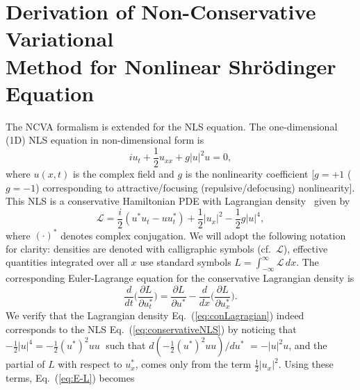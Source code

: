 \section{Derivation of Non-Conservative Variational \\ Method for Nonlinear Shr\"{o}dinger Equation}
\label{sec:NLS}
The NCVA formalism is extended for the NLS equation.  The one-dimensional (1D) NLS equation in non-dimensional form is~\cite{ref10} 
\begin{equation}
i u_t + \frac{1}{2} u_{xx} + g |u|^2 u  = 0,
\label{eq:conservativeNLS}
\end{equation}
where $u(x,t)$ is the complex field and $g$ is the nonlinearity coefficient [$g=+1$ ($g=-1$) corresponding to attractive/focusing (repulsive/defocusing) nonlinearity].  This NLS is a conservative Hamiltonian PDE with  Lagrangian density~\cite{ref5, ref6, ref10} given by
\begin{equation}
\mathcal{L} = \frac{i}{2} (u^* u_t - u u_t^*) + \frac{1}{2} |u_x|^2 - \frac{1}{2} g |u|^4,
\label{eq:conLagragian}
\end{equation}
where $(\cdot)^*$ denotes complex conjugation.  We will adopt the following notation for clarity: densities are denoted with calligraphic symbols (cf.~$\mathcal{L}$), effective quantities integrated over all $x$ use standard symbols $L = \int_{-\infty}^{\infty} {\mathcal{L}}\,dx$.
The corresponding Euler-Lagrange equation for the conservative Lagrangian density is 
\begin{equation}
\frac{d}{dt} \Bigg( \frac{\partial L}{\partial u_t^*} \Bigg) = \frac{\partial L}{\partial u^*} - \frac{d}{dx} \Bigg( \frac{\partial L}{\partial u_x^*} \Bigg).
\label{eq:E-L}
\end{equation}
We verify that the Lagrangian density Eq.~(\ref{eq:conLagragian}) indeed corresponds to the NLS Eq.~(\ref{eq:conservativeNLS}) by noticing that $-\frac{1}{2} |u|^4 = -\frac{1}{2} (u^*)^2 u u \;$ such that $d  (-\frac{1}{2} (u^*)^2 u u)/du^*$    $= -|u|^2 u$,  and the partial of $L$ with respect to $u_x^*$, comes only from the term $\frac{1}{2} |u_x|^2$.  Using these terms, Eq.~(\ref{eq:E-L}) becomes 
